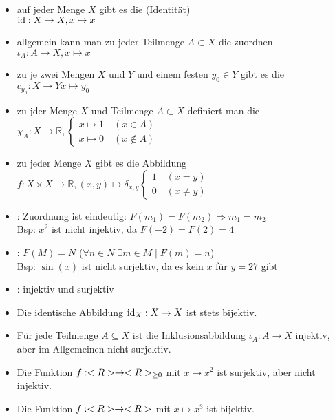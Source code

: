 \begin{example}
	\begin{itemize}
		\item auf jeder Menge $X$ gibt es die  (Identität) \\ $\operatorname{id}: X \to X, x 
		\mapsto x$
		\item allgemein kann man zu jeder Teilmenge $A \subset X$ die  zuordnen
		$\iota_A: A \to X, x \mapsto x$
		\item zu je zwei Mengen $X$ und $Y$ und einem festen $y_0 \in Y$ gibt es die  $c_{y_0}: X \to Y x \mapsto y_0$
		\item zu jder Menge $X$ und Teilmenge $A \subset X$ definiert man die \\ $\chi_A: X \to \mathbb R,
		\begin{cases}
		x \mapsto 1 \quad(x \in A) \\ x \mapsto 0 \quad(x \notin A)
		\end{cases}
		$
		\item zu jeder Menge $X$ gibt es die Abbildung \\ $f: X \times X \to \mathbb R, (x,y) \mapsto
		\delta_{x,y} \begin{cases} 1 \quad (x=y) \\ 0 \quad (x \neq y) \end{cases}$
	\end{itemize}
\end{example}

\begin{example}
	\begin{itemize}
		\item {}: Zuordnung ist eindeutig: $F(m_1) = F(m_2) \Rightarrow m_1=m_2$ \\
		Bsp: $x^2$ ist nicht injektiv, da $F(-2)=F(2)=4$
		\item {}: $F(M)=N$ ($\forall n \in N \; \exists m \in M \mid F(m)=n$) \\
		Bsp: $\sin(x)$ ist nicht surjektiv, da es kein $x$ für $y=27$ gibt
		\item {}: injektiv und surjektiv
	\end{itemize}
\end{example}

\begin{example}
	\begin{itemize}
		\item Die identische Abbildung $\operatorname{id}_X:X\to X$ ist stets bijektiv.
		\item Für jede Teilmenge $A\subseteq X$ ist die Inklusionsabbildung $\iota_A:A\to X$ injektiv, aber im Allgemeinen nicht surjektiv.
		\item Die Funktion $f:<R>\to<R>_{\ge 0}$ mit $x\mapsto x^2$ ist surjektiv, aber nicht injektiv.
		\item Die Funktion $f:<R>\to<R>$ mit $x\mapsto x^3$ ist bijektiv.
	\end{itemize}
\end{example}

